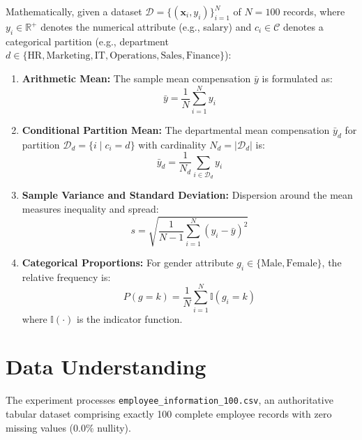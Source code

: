 Mathematically, given a dataset $\mathcal{D} = \{(\mathbf{x}_i, y_i)\}_{i=1}^{N}$ of $N = 100$ records, where $y_i \in \mathbb{R}^+$ denotes the numerical attribute (e.g., salary) and $c_i \in \mathcal{C}$ denotes a categorical partition (e.g., department $d \in \{\text{HR}, \text{Marketing}, \text{IT}, \text{Operations}, \text{Sales}, \text{Finance}\}$):
\begin{enumerate}
    \item \textbf{Arithmetic Mean:} The sample mean compensation $\bar{y}$ is formulated as:
    \begin{equation}
        \bar{y} = \frac{1}{N} \sum_{i=1}^{N} y_i
    \end{equation}
    \item \textbf{Conditional Partition Mean:} The departmental mean compensation $\bar{y}_d$ for partition $\mathcal{D}_d = \{i \mid c_i = d\}$ with cardinality $N_d = |\mathcal{D}_d|$ is:
    \begin{equation}
        \bar{y}_d = \frac{1}{N_d} \sum_{i \in \mathcal{D}_d} y_i
    \end{equation}
    \item \textbf{Sample Variance and Standard Deviation:} Dispersion around the mean measures inequality and spread:
    \begin{equation}
        s = \sqrt{\frac{1}{N-1} \sum_{i=1}^{N} (y_i - \bar{y})^2}
    \end{equation}
    \item \textbf{Categorical Proportions:} For gender attribute $g_i \in \{\text{Male}, \text{Female}\}$, the relative frequency is:
    \begin{equation}
        P(g = k) = \frac{1}{N} \sum_{i=1}^{N} \mathbb{I}(g_i = k)
    \end{equation}
    where $\mathbb{I}(\cdot)$ is the indicator function.
\end{enumerate}

\section{Data Understanding}
The experiment processes \texttt{employee\_information\_100.csv}, an authoritative tabular dataset comprising exactly 100 complete employee records with zero missing values ($0.0\%$ nullity). 


